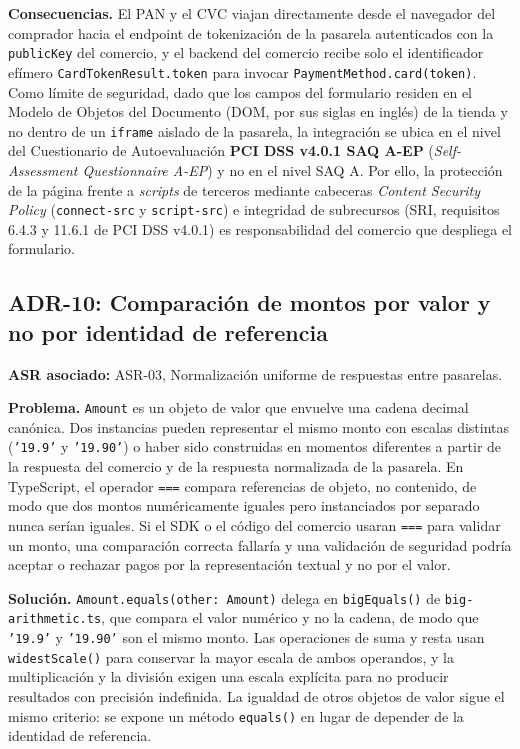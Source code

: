 \textbf{Consecuencias.} El PAN y el CVC viajan directamente desde el navegador del comprador hacia el endpoint de tokenización de la pasarela autenticados con la \texttt{publicKey} del comercio, y el backend del comercio recibe solo el identificador efímero \texttt{CardTokenResult.token} para invocar \texttt{PaymentMethod.card(token)}. Como límite de seguridad, dado que los campos del formulario residen en el Modelo de Objetos del Documento (DOM, por sus siglas en inglés) de la tienda y no dentro de un \texttt{iframe} aislado de la pasarela, la integración se ubica en el nivel del Cuestionario de Autoevaluación \textbf{PCI DSS v4.0.1 SAQ A-EP} (\textit{Self-Assessment Questionnaire A-EP}) y no en el nivel SAQ A. Por ello, la protección de la página frente a \textit{scripts} de terceros mediante cabeceras \textit{Content Security Policy} (\texttt{connect-src} y \texttt{script-src}) e integridad de subrecursos (SRI, requisitos 6.4.3 y 11.6.1 de PCI DSS v4.0.1) es responsabilidad del comercio que despliega el formulario.

\subsection{ADR-10: Comparación de montos por valor y no por identidad de referencia}
\textbf{ASR asociado:} ASR-03, Normalización uniforme de respuestas entre pasarelas.

\textbf{Problema.} \texttt{Amount} es un objeto de valor que envuelve una cadena decimal canónica. Dos instancias pueden representar el mismo monto con escalas distintas (\texttt{'19.9'} y \texttt{'19.90'}) o haber sido construidas en momentos diferentes a partir de la respuesta del comercio y de la respuesta normalizada de la pasarela. En TypeScript, el operador \texttt{===} compara referencias de objeto, no contenido, de modo que dos montos numéricamente iguales pero instanciados por separado nunca serían iguales. Si el SDK o el código del comercio usaran \texttt{===} para validar un monto, una comparación correcta fallaría y una validación de seguridad podría aceptar o rechazar pagos por la representación textual y no por el valor.

\textbf{Solución.} \texttt{Amount.equals(other: Amount)} delega en \texttt{bigEquals()} de \texttt{big-arithmetic.ts}, que compara el valor numérico y no la cadena, de modo que \texttt{'19.9'} y \texttt{'19.90'} son el mismo monto. Las operaciones de suma y resta usan \texttt{widestScale()} para conservar la mayor escala de ambos operandos, y la multiplicación y la división exigen una escala explícita para no producir resultados con precisión indefinida. La igualdad de otros objetos de valor sigue el mismo criterio: se expone un método \texttt{equals()} en lugar de depender de la identidad de referencia.

